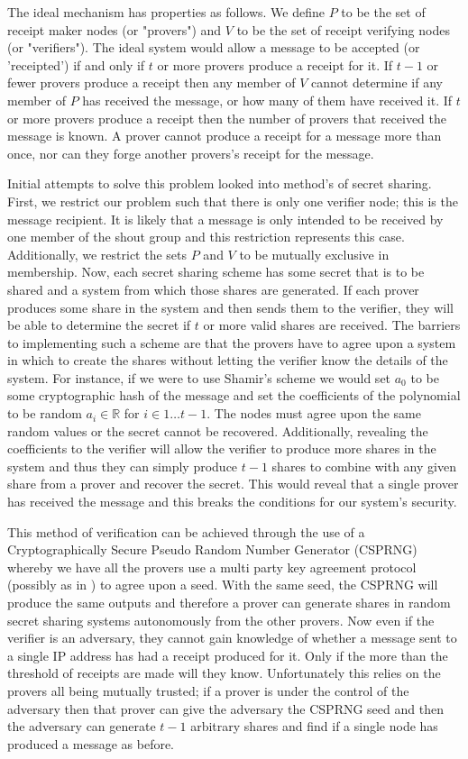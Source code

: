 \documentclass[ %
                    author={Luke Murray},
                supervisor={Dr. Simon Hollis},
                     title={Shadow Peer-to-Peer Networks},
                  subtitle={},
                    degree={MEng},
                      year={2013} ]{thesis}
\begin{document}
The ideal mechanism has properties as follows. We define $P$ to be the set of receipt maker nodes (or "provers") and $V$ to be the set of receipt verifying nodes (or "verifiers"). The ideal system would allow a message to be accepted (or 'receipted') if and only if $t$ or more provers produce a receipt for it. If $t - 1$ or fewer provers produce a receipt then any member of $V$ cannot determine if any member of $P$ has received the message, or how many of them have received it. If $t$ or more provers produce a receipt then the number of provers that received the message is known. A prover cannot produce a receipt for a message more than once, nor can they forge another provers's receipt for the message.

Initial attempts to solve this problem looked into method's of secret sharing. First, we restrict our problem such that there is only one verifier node; this is the message recipient. It is likely that a message is only intended to be received by one member of the shout group and this restriction represents this case. Additionally, we restrict the sets $P$ and $V$ to be mutually exclusive in membership. Now, each secret sharing scheme has some secret that is to be shared and a system from which those shares are generated. If each prover produces some share in the system and then sends them to the verifier, they will be able to determine the secret if $t$ or more valid shares are received. The barriers to implementing such a scheme are that the provers have to agree upon a system in which to create the shares without letting the verifier know the details of the system. For instance, if we were to use Shamir's scheme\cite{Shamir} we would set $a_0$ to be some cryptographic hash of the message and set the coefficients of the polynomial to be random $a_i \in \mathbb{R}$ for $i \in {1 \ldots t-1}$. The nodes must agree upon the same random values or the secret cannot be recovered. Additionally, revealing the coefficients to the verifier will allow the verifier to produce more shares in the system and thus they can simply produce $t-1$ shares to combine with any given share from a prover and recover the secret. This would reveal that a single prover has received the message and this breaks the conditions for our system's security.

This method of verification can be achieved through the use of a Cryptographically Secure Pseudo Random Number Generator (CSPRNG) whereby we have all the provers use a multi party key agreement protocol (possibly as in \cite{just1996authenticated}) to agree upon a seed. With the same seed, the CSPRNG will produce the same outputs and therefore a prover can generate shares in random secret sharing systems autonomously from the other provers. Now even if the verifier is an adversary, they cannot gain knowledge of whether a message sent to a single IP address has had a receipt produced for it. Only if the more than the threshold of receipts are made will they know. Unfortunately this relies on the provers all being mutually trusted; if a prover is under the control of the adversary then that prover can give the adversary the CSPRNG seed and then the adversary can generate $t-1$ arbitrary shares and find if a single node has produced a message as before.
\end{document}
